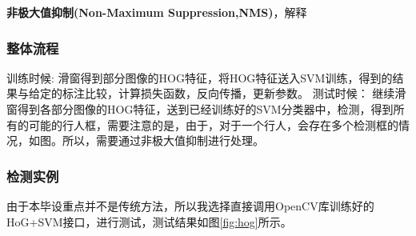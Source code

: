 \documentclass[12pt,a4paper,titlepage]{article}
\begin{document}
\textbf{非极大值抑制(Non-Maximum Suppression,NMS)}，解释
\subsubsection{整体流程}
训练时候:
滑窗得到部分图像的HOG特征，将HOG特征送入SVM训练，得到的结果与给定的标注比较，计算损失函数，反向传播，更新参数。
测试时候：
继续滑窗得到各部分图像的HOG特征，送到已经训练好的SVM分类器中，检测，得到所有的可能的行人框，需要注意的是，由于，对于一个行人，会存在多个检测框的情况，如图。所以，需要通过非极大值抑制进行处理。
\subsubsection{检测实例}
由于本毕设重点并不是传统方法，所以我选择直接调用OpenCV库训练好的HoG+SVM接口，进行测试，测试结果如图\ref{fig:hog}所示。
\end{document}
